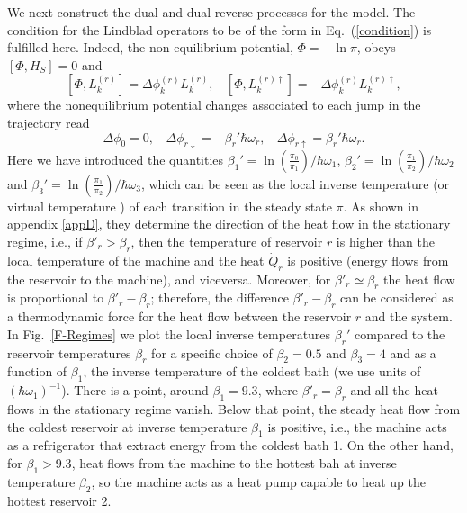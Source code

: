 \documentclass[aps,prx,twocolumn,showpacs,floatfix,superscriptaddress,graphics,longbibliography]{revtex4-1}
\newcommand{\HAT}{}
\begin{document}
We next construct the dual and dual-reverse processes for the model. The condition for the Lindblad operators 
to be of the form in Eq.~(\ref{condition}) is fulfilled here. Indeed, the non-equilibrium potential, $\HAT{\Phi} = - \ln \pi$, 
obeys $[\HAT{\Phi}, H_S] = 0$ and
\begin{equation}\label{condexample}
 [\HAT{\Phi}, L_k^{(r)}] = \Delta \phi_k^{(r)} L_k^{(r)}, ~~~~ [\HAT{\Phi}, L_k^{(r) \dagger}] = - \Delta \phi_k^{(r)} L_k^{(r) \dagger},
\end{equation}
where the nonequilibrium potential changes associated to each jump in the trajectory read
\begin{equation}\label{nep}
 \Delta \phi_0 = 0, ~~~~ \Delta \phi_{r \downarrow} = - \beta_r' \hbar \omega_r, ~~~~ \Delta \phi_{r \uparrow} = \beta_r' \hbar \omega_r.
\end{equation}
Here we have introduced the quantities $\beta_1'= \ln(\frac{\pi_0}{\pi_1}) /\hbar \omega_1$, $\beta_2'= \ln(\frac{\pi_1}{\pi_2}) /\hbar \omega_2$ and 
$\beta_3'= \ln(\frac{\pi_1}{\pi_2}) /\hbar \omega_3$, which can be seen as the local inverse temperature (or virtual temperature \cite{VirtualQubits, VirtualTemperatures,Ral16})  of each transition in the steady state $\pi$. As shown in appendix \ref{appD}, they determine the direction of the heat flow in the stationary regime, i.e., if $\beta'_r>\beta_r$, then the temperature of reservoir $r$ is higher than the local temperature of the machine and the heat $\dot Q_r$ is positive (energy flows from the reservoir to the machine), and viceversa. Moreover, for $\beta'_r\simeq \beta_r$ the heat flow is proportional to  $\beta'_r -\beta_r$; therefore, the difference $\beta'_r -\beta_r$ can be considered as a thermodynamic force for the heat flow between the reservoir $r$ and the system. In Fig.~\ref{F-Regimes} we plot the local inverse temperatures $\beta_r'$ compared to the reservoir temperatures $\beta_r$ for a specific choice of $\beta_2=0.5$ and $\beta_3=4$ and as a function of $\beta_1$, the inverse temperature of the coldest bath (we use units of $(\hbar \omega_1)^{-1}$). There is a point, around $\beta_1=9.3$, where $\beta'_r=\beta_r$ and all the heat flows in the stationary regime vanish. Below that point, the steady heat flow from the coldest reservoir at inverse temperature $\beta_1$ is positive, i.e., the machine acts as a refrigerator that extract energy from the coldest bath 1. On the other hand, for $\beta_1>9.3$, heat flows from the machine to the hottest bah at inverse temperature $\beta_2$, so  the machine acts as a heat pump capable to heat up the hottest reservoir 2.
\end{document}
